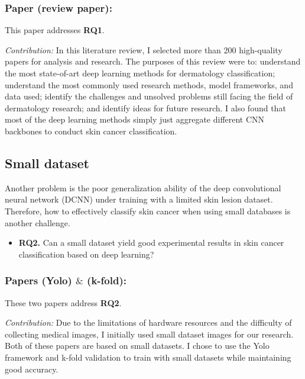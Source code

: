 \subsubsection{Paper \uppercase\expandafter{} (review paper):} This paper addresses \textbf{RQ1}.


\textit{Contribution: }
In this literature review, I selected more than 200 high-quality papers for analysis and research. The purposes of this review were to: understand the most state-of-art deep learning methods for dermatology classification; understand the most commonly used research methods, model frameworks, and data used; identify the challenges and unsolved problems still facing the field of dermatology research; and identify ideas for future research. I also found that most of the deep learning methods simply  just aggregate different CNN backbones to conduct skin cancer classification.
  
\subsection{Small dataset}
Another problem is the poor generalization ability of the deep convolutional neural network (DCNN) under training with a limited skin lesion dataset. Therefore, how to effectively classify skin cancer when using small databases is another challenge.
\begin{itemize} \label{sec.rq2}
    \item \textbf{RQ2.} Can a small dataset yield good experimental results in skin cancer classification based on deep learning?   
\end{itemize}

\subsubsection{Papers \uppercase\expandafter{} (Yolo) $\&$  \uppercase\expandafter{} (k-fold):}
These two papers address \textbf{RQ2}.

\textit{Contribution: }
Due to the limitations of hardware resources and the difficulty of collecting medical images, I initially used small dataset images for our research. Both of these papers are based on small datasets. I chose to use the Yolo framework \cite{redmon2016you} and k-fold validation to train with small datasets while maintaining good accuracy.


